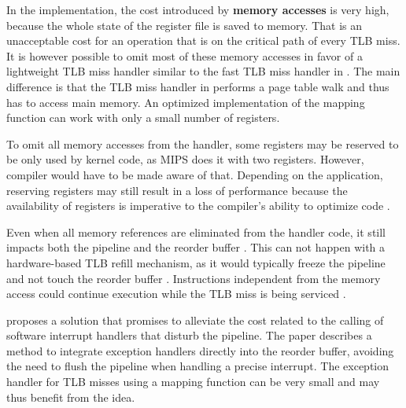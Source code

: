 In the implementation, the cost introduced by \textbf{memory accesses} is very high, because the whole state of the register file is saved to memory. That is an unacceptable cost for an operation that is on the critical path of every TLB miss. It is however possible to omit most of these memory accesses in favor of a lightweight TLB miss handler similar to the fast TLB miss handler in \cite{heiserAnatomyHighPerformanceMicrokernel}. The main difference is that the TLB miss handler in \cite{heiserAnatomyHighPerformanceMicrokernel} performs a page table walk and thus has to access main memory. An optimized implementation of the mapping function can work with only a small number of registers.

To omit all memory accesses from the handler, some registers may be reserved to be only used by kernel code, as MIPS does it with two registers. However, compiler would have to be made aware of that. Depending on the application, reserving registers may still result in a loss of performance because the availability of registers is imperative to the compiler's ability to optimize code \cite{elphinstone2013l3}.

Even when all memory references are eliminated from the handler code, it still impacts both the pipeline and the reorder buffer \cite{jacobSoftwaremanagedAddressTranslation1997}. This can not happen with a hardware-based TLB refill mechanism, as it would typically freeze the pipeline and not touch the reorder buffer \cite{bhattacharjee2017architectural}. Instructions independent from the memory access could continue execution while the TLB miss is being serviced \cite{jacob1998virtualissues}.

\cite{jaleel2001line} proposes a solution that promises to alleviate the cost related to the calling of software interrupt handlers that disturb the pipeline. The paper describes a method to integrate exception handlers directly into the reorder buffer, avoiding the need to flush the pipeline when handling a precise interrupt. The exception handler for TLB misses using a mapping function can be very small and may thus benefit from the idea.





